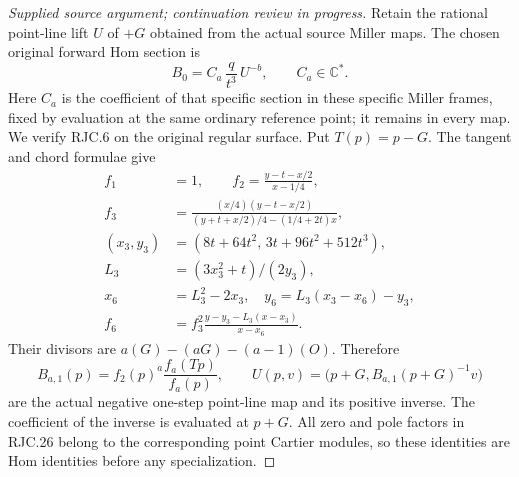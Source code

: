 \begin{proof}[Supplied source argument; continuation review in progress]
Retain the rational point-line lift \(U\) of \(+G\) obtained from the
actual source Miller maps. The chosen original forward Hom section is
\[
 B_0=C_a\,\frac{q}{t^3}\,U^{-b},\qquad C_a\in\mathbb C^*.             \tag{RJC.6}
\]
Here \(C_a\) is the coefficient of that specific section in these
specific Miller frames, fixed by evaluation at the same ordinary
reference point; it remains in every map. We verify RJC.6 on the
original regular surface. Put \(T(p)=p-G\). The tangent and chord
formulae give
\[
 \begin{split}
 f_1&=1,\qquad
 f_2=\frac{y-t-x/2}{x-1/4},\\
 f_3&=\frac{(x/4)(y-t-x/2)}
 {(y+t+x/2)/4-(1/4+2t)x},\\
 (x_3,y_3)&=(8t+64t^2,\,3t+96t^2+512t^3),\\
 L_3&=(3x_3^2+t)/(2y_3),\\
 x_6&=L_3^2-2x_3,\quad y_6=L_3(x_3-x_6)-y_3,\\
 f_6&=f_3^2\frac{y-y_3-L_3(x-x_3)}{x-x_6}.
 \end{split}
 \tag{RJC.26}
\]
Their divisors are \(a(G)-(aG)-(a-1)(O)\). Therefore
\[
 B_{a,1}(p)=f_2(p)^a\frac{f_a(Tp)}{f_a(p)},\qquad
 U(p,v)=\bigl(p+G,B_{a,1}(p+G)^{-1}v\bigr)
 \tag{RJC.27}
\]
are the actual negative one-step point-line map and its positive
inverse. The coefficient of the inverse is evaluated at \(p+G\).
All zero and pole factors in RJC.26 belong to the corresponding
point Cartier modules, so these identities are Hom identities
before any specialization.


\end{proof}
